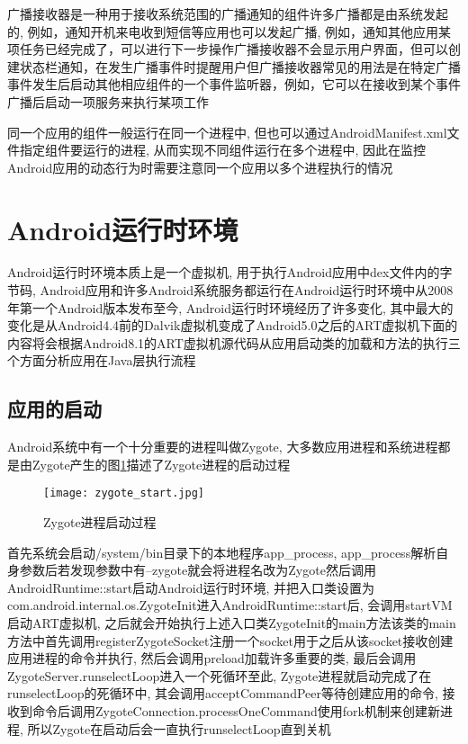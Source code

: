 广播接收器是一种用于接收系统范围的广播通知的组件\juhao 许多广播都是由系统发起的, 例如，通知开机\dunhao 来电\dunhao 收到短信等\juhao 应用也可以发起广播, 例如，通知其他应用某项任务已经完成了，可以进行下一步操作\juhao 广播接收器不会显示用户界面，但可以创建状态栏通知，在发生广播事件时提醒用户\juhao 但广播接收器常见的用法是在特定广播事件发生后启动其他相应组件的一个事件监听器，例如，它可以在接收到某个事件广播后启动一项服务来执行某项工作\juhao

同一个应用的组件一般运行在同一个进程中, 但也可以通过AndroidManifest.xml文件指定组件要运行的进程, 从而实现不同组件运行在多个进程中, 因此在监控Android应用的动态行为时需要注意同一个应用以多个进程执行的情况\juhao 

\section{Android运行时环境}
\label{androidRuntime}
Android运行时环境本质上是一个虚拟机, 用于执行Android应用中dex文件内的字节码, Android应用和许多Android系统服务都运行在Android运行时环境中\juhao 从2008年第一个Android版本发布至今, Android运行时环境经历了许多变化, 其中最大的变化是从Android4.4前的Dalvik虚拟机变成了Android5.0之后的ART虚拟机\juhao 下面的内容将会根据Android8.1的ART虚拟机源代码从应用启动\dunhao 类的加载和方法的执行\dunhao 三个方面分析应用在Java层执行流程\juhao

\subsection{应用的启动}
\label{appStartA}
Android系统中有一个十分重要的进程叫做Zygote, 大多数应用进程和系统进程都是由Zygote产生的\juhao 图\ref{zygoteStart}描述了Zygote进程的启动过程\juhao
\begin{figure}[ht]
	\centering
	\texttt{[image: zygote\_start.jpg]}
	\caption{Zygote进程启动过程}
	\label{zygoteStart}
\end{figure}

首先系统会启动/system/bin目录下的本地程序app\_process, app\_process解析自身参数后若发现参数中有--zygote就会将进程名改为Zygote然后调用AndroidRuntime::start启动Android运行时环境, 并把入口类设置为com.android.internal.os.ZygoteInit\juhao 进入AndroidRuntime::start后, 会调用startVM启动ART虚拟机, 之后就会开始执行上述入口类ZygoteInit的main方法\juhao 该类的main方法中首先调用registerZygoteSocket注册一个socket用于之后从该socket接收创建应用进程的命令并执行, 然后会调用preload加载许多重要的类, 最后会调用ZygoteServer.runselectLoop进入一个死循环\juhao 至此, Zygote进程就启动完成了\juhao 在runselectLoop的死循环中, 其会调用acceptCommandPeer等待创建应用的命令, 接收到命令后调用ZygoteConnection.processOneCommand使用fork机制来创建新进程, 所以Zygote在启动后会一直执行runselectLoop直到关机\juhao

